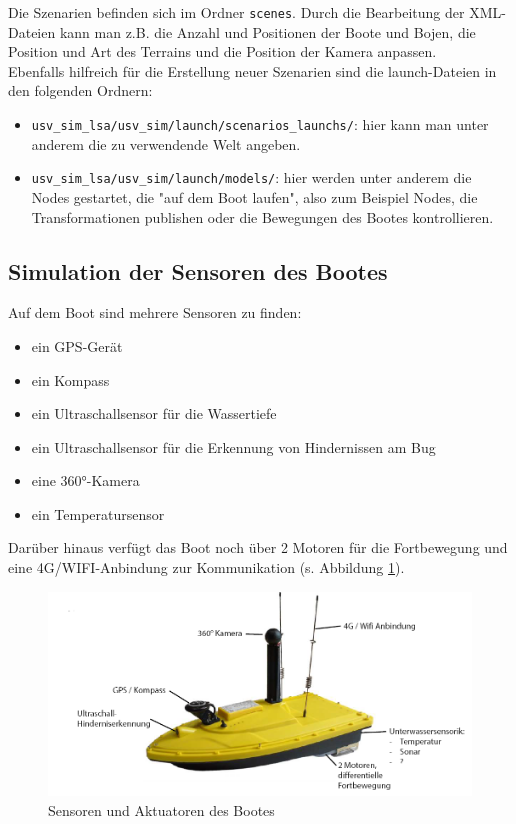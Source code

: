 \documentclass[11pt]{article}
\begin{document}
Die Szenarien befinden sich im Ordner \texttt{scenes}. Durch die Bearbeitung der XML-Dateien kann man z.B. die Anzahl und Positionen der Boote und Bojen, die Position und Art des Terrains und die Position der Kamera anpassen.\\
Ebenfalls hilfreich für die Erstellung neuer Szenarien sind die launch-Dateien in den folgenden Ordnern:

\begin{itemize}
	\item \texttt{usv\_sim\_lsa/usv\_sim/launch/scenarios\_launchs/}: hier kann man unter anderem die zu verwendende Welt angeben.
	\item \texttt{usv\_sim\_lsa/usv\_sim/launch/models/}: hier werden unter anderem die Nodes gestartet, die "auf dem Boot laufen", also zum Beispiel Nodes, die Transformationen publishen oder die Bewegungen des Bootes kontrollieren.
\end{itemize}

\subsection{Simulation der Sensoren des Bootes}

Auf dem Boot sind mehrere Sensoren zu finden:

\begin{itemize}
	\item ein GPS-Gerät
	\item ein Kompass
	\item ein Ultraschallsensor für die Wassertiefe
	\item ein Ultraschallsensor für die Erkennung von Hindernissen am Bug
	\item eine 360°-Kamera
	\item ein Temperatursensor
\end{itemize}

Darüber hinaus verfügt das Boot noch über 2 Motoren für die Fortbewegung und eine 4G/WIFI-Anbindung zur Kommunikation (s. Abbildung \ref{boot}).\\

\begin{figure}[h]
    \centering
	\includegraphics[width=0.9\linewidth]{boot.png}
	\caption{Sensoren und Aktuatoren des Bootes}
	\label{boot}
\end{figure}
\end{document}
